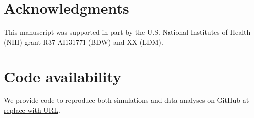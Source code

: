 \documentclass[12pt]{article}
\begin{document}
\section*{Acknowledgments}
This manuscript was supported in part by the U.S. National Institutes of Health (NIH) grant R37 AI131771 (BDW) and XX (LDM).

\section*{Code availability}
We provide code to reproduce both simulations and data analyses on GitHub at \url{replace with URL}.

\appendix




\end{document}
